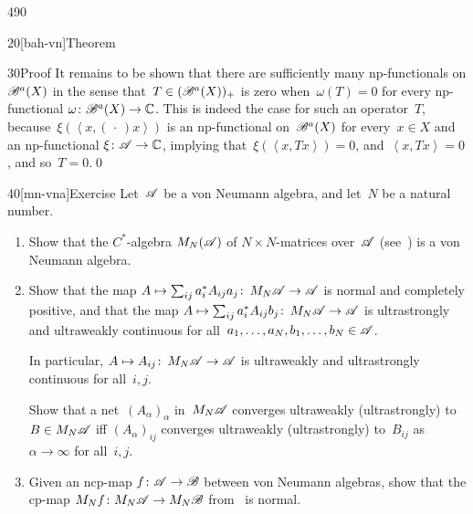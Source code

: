 \begin{parsec}{490}
\begin{point}{20}[bah-vn]{Theorem}
\begin{point}{30}{Proof}
It remains to be shown that
there are sufficiently many np-functionals on $\mathscr{B}^a(X)$
in the sense that~$T\in(\mathscr{B}^a(X))_+$ is zero
when~$\omega(T)=0$ for every np-functional $\omega\colon \mathscr{B}^a(X)\to\mathbb{C}$.
This is indeed
the case for such an operator~$T$,
because~$\xi(\left<x,(\,\cdot\,)x\right>)$
is an np-functional on~$\mathscr{B}^a(X)$
for every~$x\in X$
and an np-functional $\xi\colon \mathscr{A}\to\mathbb{C}$,
implying that~$\xi(\left<x,Tx\right>)=0$,
and~$\left<x,Tx\right>=0$,
and so~$T=0$.\qed
\end{point}
\end{point}
\begin{point}{40}[mn-vna]{Exercise}%
%
Let~$\mathscr{A}$ be a von Neumann algebra,
and let~$N$ be a natural number.
\begin{enumerate}
\item
Show 
that the $C^*$-algebra
$M_N(\mathscr{A})$ of $N\times N$-matrices over~$\mathscr{A}$ (see~)
is a von Neumann algebra.
\item
Show that
the map $A\mapsto \sum_{ij} a_i^* A_{ij} a_j\colon\, M_N\mathscr{A}\to \mathscr{A}$
is normal and completely positive,
and that
the map $A\mapsto \sum_{ij} a_i^* A_{ij} b_j\colon\, M_N\mathscr{A}\to\mathscr{A}$
is ultrastrongly and ultraweakly continuous
for all~$a_1,\dotsc,a_N,b_1,\dotsc,b_N\in\mathscr{A}$.

In particular, $A\mapsto A_{ij}\colon\,M_N\mathscr{A}\to\mathscr{A}$
is ultraweakly and ultrastrongly continuous
for all~$i,j$.

Show that a net~$(A_\alpha)_\alpha$
in~$M_N\mathscr{A}$
converges ultraweakly (ultrastrongly)
to $B\in M_N\mathscr{A}$
iff $(A_\alpha)_{ij}$ converges ultraweakly (ultrastrongly)
to~$B_{ij}$ as~$\alpha\to\infty$ for all~$i,j$.
\item
Given an ncp-map $f\colon \mathscr{A}\to\mathscr{B}$
between von Neumann algebras,
show that the cp-map $M_N f\colon M_N\mathscr{A}\to M_N\mathscr{B}$
from~ is normal.%
\end{enumerate}
\spacingfix%
\end{point}%
\end{parsec}%
